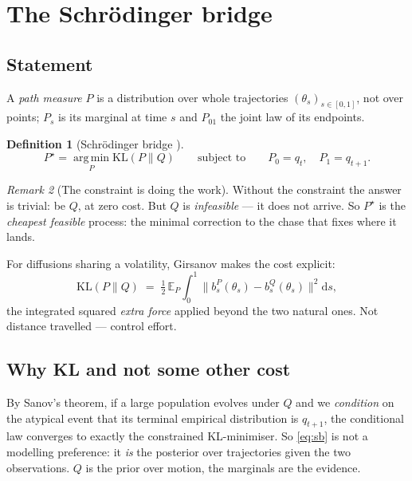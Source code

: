 \documentclass[11pt]{article}
\theoremstyle{definition}
\newtheorem{definition}{Definition}[section]
\theoremstyle{plain}
\theoremstyle{remark}
\newtheorem{remark}[definition]{Remark}
\newcommand{\Eb}{\mathbb{E}}
\newcommand{\KL}{\mathrm{KL}}
\begin{document}
\section{The Schr\"odinger bridge}
\label{sec:sb}

\subsection{Statement}

A \emph{path measure} $P$ is a distribution over whole trajectories
$(\theta_s)_{s\in[0,1]}$, not over points; $P_s$ is its marginal at time $s$ and
$P_{01}$ the joint law of its endpoints.

\begin{definition}[Schr\"odinger bridge \cite{leonard}]
\begin{equation}
P^\star = \operatorname*{arg\,min}_{P} \KL(P \| Q)
\qquad\text{subject to}\qquad P_0 = q_t, \quad P_1 = q_{t+1}.
\label{eq:sb}
\end{equation}
\end{definition}

\begin{remark}[The constraint is doing the work]
Without the constraint the answer is trivial: be $Q$, at zero cost. But $Q$ is
\emph{infeasible} --- it does not arrive. So $P^\star$ is the \emph{cheapest
feasible} process: the minimal correction to the chase that fixes where it
lands.
\end{remark}

For diffusions sharing a volatility, Girsanov makes the cost explicit:
\begin{equation}
\KL(P\|Q) \;=\; \tfrac{1}{2}\,\Eb_P \int_0^1 \big\lVert b^P_s(\theta_s) - b^Q_s(\theta_s) \big\rVert^2 \mathrm{d}s ,
\end{equation}
the integrated squared \emph{extra force} applied beyond the two natural ones.
Not distance travelled --- control effort.

\subsection{Why KL and not some other cost}

By Sanov's theorem, if a large population evolves under $Q$ and we
\emph{condition} on the atypical event that its terminal empirical distribution
is $q_{t+1}$, the conditional law converges to exactly the constrained
KL-minimiser. So \eqref{eq:sb} is not a modelling preference: it \emph{is} the
posterior over trajectories given the two observations. $Q$ is the prior over
motion, the marginals are the evidence.
\end{document}
